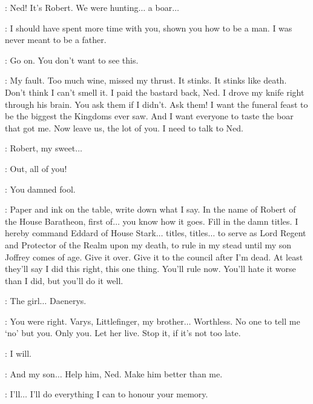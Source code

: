 
\RENLY: Ned! It's Robert. We were hunting$\ldots$ a boar$\ldots$ 


\ROBERT:  I should have spent more time with you, shown you how to be a man. I was never meant to be a father.


\ROBERT:  Go on. You don't want to see this.


\ROBERT:  My fault. Too much wine, missed my thrust. It stinks. It stinks like death. Don't think I can't smell it. I paid the bastard back, Ned. I drove my knife right through his brain. You ask them if I didn't. Ask them! I want the funeral feast to be the biggest the Kingdoms ever saw. And I want everyone to taste the boar that got me. Now leave us, the lot of you. I need to talk to Ned. 

\CERSEI: Robert, my sweet$\ldots$ 

\ROBERT: Out, all of you! 


\NED: You damned fool. 

\ROBERT: Paper and ink on the table, write down what I say. In the name of Robert of the House Baratheon, first of$\ldots$ you know how it goes. Fill in the damn titles. I hereby command Eddard of House Stark$\ldots$ titles, titles$\ldots$ to serve as Lord Regent and Protector of the Realm upon my death, to rule in my stead until my son Joffrey comes of age. Give it over. Give it to the council after I'm dead. At least they'll say I did this right, this one thing. You'll rule now. You'll hate it worse than I did, but you'll do it well. 

\NED: The girl$\ldots$ Daenerys. 

\ROBERT: You were right. Varys, Littlefinger, my brother$\ldots$ Worthless. No one to tell me `no' but you. Only you. Let her live. Stop it, if it's not too late. 

\NED: I will. 

\ROBERT: And my son$\ldots$ Help him, Ned. Make him better than me. 

\NED: I'll$\ldots$ I'll do everything I can to honour your memory. 

